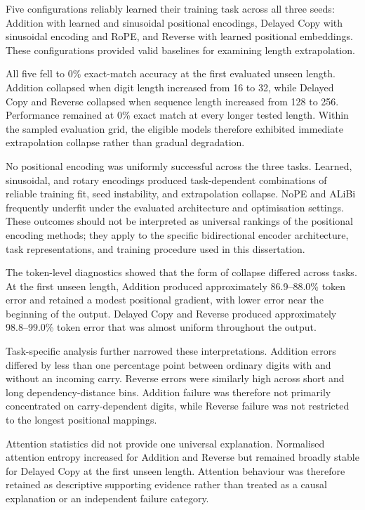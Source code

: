 \documentclass[
    author={Aanchala Ravindra Bhongade},
    supervisor={Dr. Fernando Moreno-Pino},
    degree={MSc},
    title={Length Generalisation in Transformer-Based Sequence Models: Failure Taxonomy and Mitigation Strategies},
    subtitle={},
    type={},
    year={2026}
]{dissertation}
\begin{document}
Five configurations reliably learned their training task across all three seeds: Addition with learned and sinusoidal positional encodings, Delayed Copy with sinusoidal encoding and RoPE, and Reverse with learned positional embeddings. These configurations provided valid baselines for examining length extrapolation.

All five fell to 0\% exact-match accuracy at the first evaluated unseen length. Addition collapsed when digit length increased from 16 to 32, while Delayed Copy and Reverse collapsed when sequence length increased from 128 to 256. Performance remained at 0\% exact match at every longer tested length. Within the sampled evaluation grid, the eligible models therefore exhibited immediate extrapolation collapse rather than gradual degradation.

No positional encoding was uniformly successful across the three tasks. Learned, sinusoidal, and rotary encodings produced task-dependent combinations of reliable training fit, seed instability, and extrapolation collapse. NoPE and ALiBi frequently underfit under the evaluated architecture and optimisation settings. These outcomes should not be interpreted as universal rankings of the positional encoding methods; they apply to the specific bidirectional encoder architecture, task representations, and training procedure used in this dissertation.

The token-level diagnostics showed that the form of collapse differed across tasks. At the first unseen length, Addition produced approximately 86.9--88.0\% token error and retained a modest positional gradient, with lower error near the beginning of the output. Delayed Copy and Reverse produced approximately 98.8--99.0\% token error that was almost uniform throughout the output.

Task-specific analysis further narrowed these interpretations. Addition errors differed by less than one percentage point between ordinary digits with and without an incoming carry. Reverse errors were similarly high across short and long dependency-distance bins. Addition failure was therefore not primarily concentrated on carry-dependent digits, while Reverse failure was not restricted to the longest positional mappings.

Attention statistics did not provide one universal explanation. Normalised attention entropy increased for Addition and Reverse but remained broadly stable for Delayed Copy at the first unseen length. Attention behaviour was therefore retained as descriptive supporting evidence rather than treated as a causal explanation or an independent failure category.
\end{document}
